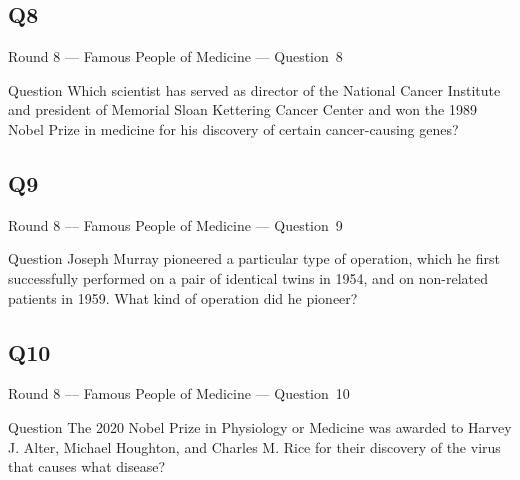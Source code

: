 \documentclass[11pt]{beamer}
\begin{document}
\subsection*{Q8}
\begin{frame}[t]{Round 8 --- Famous People of Medicine --- \mbox{Question 8}}
\vspace{-0.5em}
\begin{block}{Question}
Which scientist has served as director of the National Cancer Institute and president of Memorial Sloan Kettering Cancer Center and won the 1989 Nobel Prize in medicine for his discovery of certain cancer-causing genes?
\end{block}
\end{frame}
\subsection*{Q9}
\begin{frame}[t]{Round 8 --- Famous People of Medicine --- \mbox{Question 9}}
\vspace{-0.5em}
\begin{block}{Question}
Joseph Murray pioneered a particular type of operation, which he first successfully performed on a pair of identical twins in 1954, and on non-related patients in 1959. What kind of operation did he pioneer?
\end{block}
\end{frame}
\subsection*{Q10}
\begin{frame}[t]{Round 8 --- Famous People of Medicine --- \mbox{Question 10}}
\vspace{-0.5em}
\begin{block}{Question}
The 2020 Nobel Prize in Physiology or Medicine was awarded to Harvey J. Alter, Michael Houghton, and Charles M. Rice for their discovery of the virus that causes what disease?
\end{block}
\end{frame}
\end{document}
